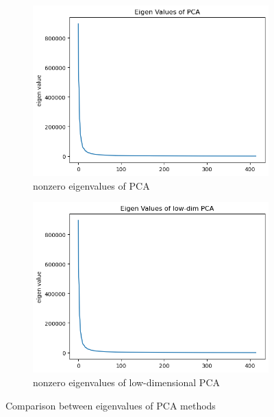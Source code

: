 \begin{figure}[H]
	\centering
	\begin{subfigure}[t]{0.48\linewidth}
		\centering
		\includegraphics[width=\linewidth]{image/q1_eigval_pca.png}
		\caption{nonzero eigenvalues of PCA}
		\label{fig:eigval_pca}
	\end{subfigure}%
	\hfill
	\begin{subfigure}[t]{0.48\linewidth}
		\centering
		\includegraphics[width=\linewidth]{image/q1_eigval_lowdim.png}
		\caption{nonzero eigenvalues of low-dimensional PCA}
		\label{fig:eigval_lowdim}
	\end{subfigure}
	\caption{Comparison between eigenvalues of PCA methods}
	\label{fig:q1_eigval}
\end{figure}

